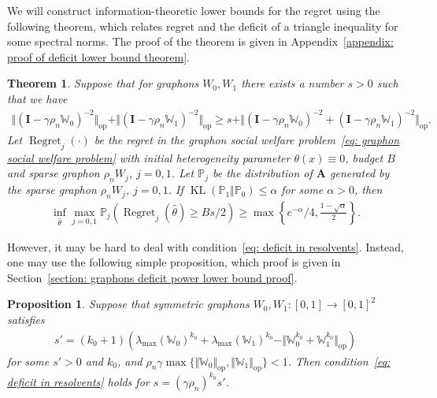 \documentclass[11pt]{article}
\newcommand{\op}{\mathrm{op}}
\newcommand{\bA}{\bm{A}}
\newcommand{\bI}{\bm{I}}
\newcommand{\bbW}{\mathbb{W}}
\newcommand{\bbP}{\mathbb{P}}
\newcommand{\KL}[2]{\operatorname{KL}\left (#1\Vert #2 \right )}
\newcommand{\<}{\langle}
\renewcommand{\>}{\rangle}
\newcommand{\regret}{\operatorname{Regret}}
\theoremstyle{plain}
\newtheorem{theorem}{Theorem}
\newtheorem{prop}{Proposition}
\theoremstyle{definition}
\theoremstyle{remark}
\begin{document}
{We will construct information-theoretic lower bounds for the regret using the following theorem, which relates regret and the deficit of a triangle inequality for some spectral norms. The proof of the theorem is given in Appendix~\ref{appendix: proof of deficit lower bound theorem}.

\begin{theorem}
\label{theorem: spectral norms deficit}
Suppose that for graphons $W_0, W_1$ there exists a number $s > 0$ such that we have
\begin{align}
\label{eq: deficit in resolvents}
    \Vert (\bI - \gamma \rho_n \bbW_0)^{-2} \Vert_{\op} +  \Vert (\bI - \gamma \rho_n \bbW_1)^{-2} \Vert_{\op} \ge s + \Vert (\bI - \gamma \rho_n \bbW_0)^{-2} + (\bI - \gamma \rho_n \bbW_1)^{-2}\Vert_{\op}.
\end{align}
Let $\regret_j(\cdot)$ be the regret in the graphon social welfare problem~\eqref{eq: graphon social welfare problem} with initial heterogeneity parameter $\theta(x) \equiv 0$, budget $B$ and sparse graphon $\rho_n W_j$, $j = 0, 1$. Let $\bbP_j$ be the distribution of $\bA$ generated by the sparse graphon $\rho_n W_j$, $j = 0, 1$. If $\KL{\bbP_1}{\bbP_0} \le \alpha$ 
for some $\alpha > 0$, then
\begin{align*}
    \inf_{\widehat{\theta}} \max_{j = 0, 1} \bbP_j \left ( \regret_j(\widehat{\theta}) \ge B s/2 \right ) \ge \max \left \{ e^{-\alpha}/4, \frac{1 - \sqrt{\alpha}}{2} \right  \}.
\end{align*}
\end{theorem}

 However, it may be hard to deal with condition~\eqref{eq: deficit in resolvents}. Instead, one may use the following simple proposition, which proof is given in Section~\ref{section: graphons deficit power lower bound proof}.

\begin{prop}
\label{proposition: graphons power upper bound}
Suppose that symmetric graphons $W_0, W_1:[0, 1] \to [0, 1]^2$ satisfies
\begin{align*}
    s' = (k_0 + 1) \left ( \lambda_{\max}(\bbW_0)^{k_0} + \lambda_{\max}(\bbW_1 )^{k_0}  - \Vert \bbW_0^{k_0} + \bbW_1^{k_0} \Vert_{\op}\right )
\end{align*}
for some $s' > 0$ and $k_0$,
and $\rho_n \gamma \max\{\Vert \bbW_0 \Vert_{\op}, \Vert \bbW_1 \Vert_{\op} \} < 1$. Then condition~\eqref{eq: deficit in resolvents} holds for $s = (\gamma \rho_n)^{k_0} s'$.
\end{prop}


}
\end{document}
